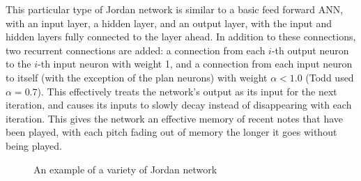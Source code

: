 \documentclass[ author={Stephen Livermore-Tozer},
				supervisor={Dr. Peter Flach},
				degree={MEng},
				title={Performing Algorithmic Co-composition Using Machine Learning},
				subtitle={},
				type={research},
				year={2016} ]{dissertation}
\begin{document}
	This particular type of Jordan network is similar to a basic feed forward ANN, with an input layer, a hidden layer, and an output layer, with the input and hidden layers fully connected to the layer ahead. In addition to these connections, two recurrent connections are added: a connection from each $i$-th output neuron to the $i$-th input neuron with weight 1, and a connection from each input neuron to itself (with the exception of the plan neurons) with weight $\alpha < 1.0$ (Todd used $\alpha = 0.7$). This effectively treats the network's output as its input for the next iteration, and causes its inputs to slowly decay instead of disappearing with each iteration. This gives the network an effective memory of recent notes that have been played, with each pitch fading out of memory the longer it goes without being played.
	
	\begin{figure}[!ht]
		\centering
		\caption{An example of a variety of Jordan network}
	\end{figure}
	
\end{document}
